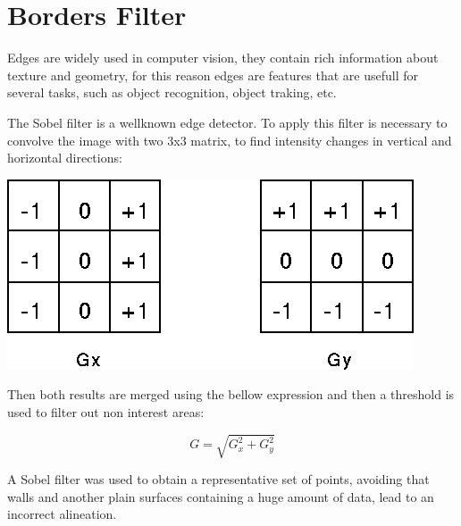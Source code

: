 \section{Borders Filter}

Edges are widely used in computer vision, they contain rich information about texture 
and geometry, for this reason edges are features that are usefull for several tasks, 
such as object recognition, object traking, etc.


The Sobel filter is a wellknown edge detector. To apply this filter is necessary to 
convolve the image with two 3x3 matrix, to find intensity changes in vertical and 
horizontal directions:

\begin{center}
\includegraphics[scale=0.35]{images/sobel}
\end{center}

Then both results are merged using the bellow expression and then a threshold is used to filter out non interest areas:

$$ G = \sqrt{G_x^2+ G_y^2} $$

A Sobel filter was used to obtain a representative set of points, avoiding that walls and another 
plain surfaces containing a huge amount of data, lead to an incorrect alineation.

